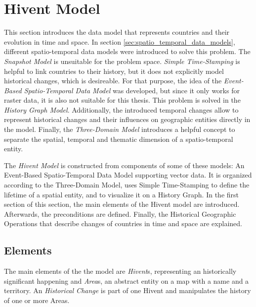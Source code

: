 \section{Hivent Model} %
\label{sec:hivent_model}

This section introduces the data model that represents countries and their evolution in time and space. In section \ref{sec:spatio_temporal_data_models}, different spatio-temporal data models were introduced to solve this problem. The \emph{Snapshot Model} is unsuitable for the problem space. \emph{Simple Time-Stamping} is helpful to link countries to their history, but it does not explicitly model historical changes, which is desireable. For that purpose, the idea of the \emph{Event-Based Spatio-Temporal Data Model} was developed, but since it only works for raster data, it is also not suitable for this thesis. This problem is solved in the \emph{History Graph Model}. Additionally, the introduced temporal changes allow to represent historical changes and their influences on geographic entities directly in the model. Finally, the \emph{Three-Domain Model} introduces a helpful concept to separate the spatial, temporal and thematic dimension of a spatio-temporal entity.

The \emph{Hivent Model} is constructed from components of some of these models: An Event-Based Spatio-Temporal Data Model supporting vector data. It is organized according to the Three-Domain Model, uses Simple Time-Stamping to define the lifetime of a spatial entity, and to visualize it on a History Graph. In the first section of this section, the main elements of the Hivent model are introduced. Afterwards, the preconditions are defined. Finally, the Historical Geographic Operations that describe changes of countries in time and space are explained.

\subsection{Elements} %
\label{sub:elements}

The main elements of the the model are \emph{Hivent}s, representing an historically significant happening and \emph{Area}s, an abstract entity on a map with a name and a territory. An \emph{Historical Change} is part of one Hivent and manipulates the history of one or more Areas.

\vspace{-1em}
